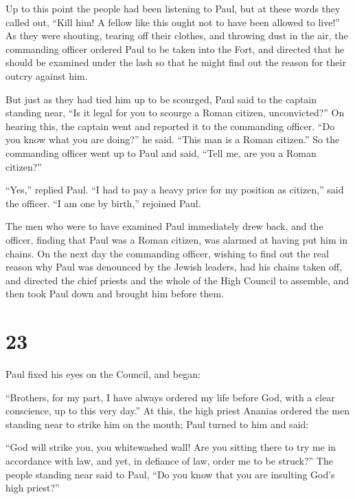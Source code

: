  Up to this point the people had been listening to Paul,
but at these words they called out, ``Kill him! A fellow like this ought
not to have been allowed to live!''  As they were shouting,
tearing off their clothes, and throwing dust in the air, 
the commanding officer ordered Paul to be taken into the Fort, and
directed that he should be examined under the lash so that he might find
out the reason for their outcry against him.

 But just as they had tied him up to be scourged, Paul said
to the captain standing near, ``Is it legal for you to scourge a Roman
citizen, unconvicted?''  On hearing this, the captain went
and reported it to the commanding officer. ``Do you know what you are
doing?'' he said. ``This man is a Roman citizen.''  So the
commanding officer went up to Paul and said, ``Tell me, are you a Roman
citizen?''

``Yes,'' replied Paul.  ``I had to pay a heavy price for my
position as citizen,'' said the officer. ``I am one by birth,'' rejoined
Paul.

 The men who were to have examined Paul immediately drew
back, and the officer, finding that Paul was a Roman citizen, was
alarmed at having put him in chains.  On the next day the
commanding officer, wishing to find out the real reason why Paul was
denounced by the Jewish leaders, had his chains taken off, and directed
the chief priests and the whole of the High Council to assemble, and
then took Paul down and brought him before them.

\hypertarget{section-22}{%
\section{23}\label{section-22}}

 Paul fixed his eyes on the Council, and began:

``Brothers, for my part, I have always ordered my life before God, with
a clear conscience, up to this very day.''  At this, the
high priest Ananias ordered the men standing near to strike him on the
mouth;  Paul turned to him and said:

``God will strike you, you whitewashed wall! Are you sitting there to
try me in accordance with law, and yet, in defiance of law, order me to
be struck?''  The people standing near said to Paul, ``Do
you know that you are insulting God's high priest?''


